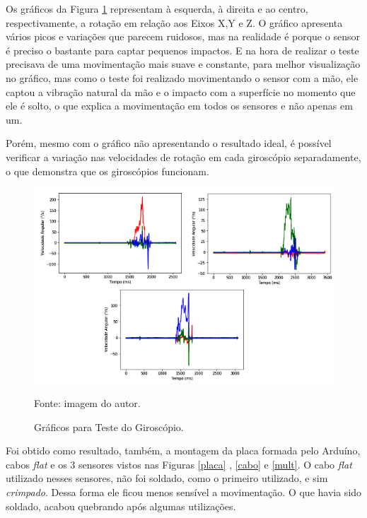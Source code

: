 	Os gráficos da Figura \ref{teste_giro} representam à esquerda, à direita e ao centro, respectivamente, a rotação em relação aos Eixos X,Y e Z. O gráfico apresenta vários picos e variações que parecem ruidosos, mas na realidade é porque o sensor é  preciso o bastante para captar pequenos impactos. E na hora de realizar o teste precisava de uma movimentação mais suave e constante, para melhor visualização no gráfico, mas como o teste foi realizado movimentando o sensor com a mão, ele captou a vibração natural da mão e o impacto com a superfície no momento que ele é solto, o que explica a movimentação em todos os sensores e não apenas em um.
	
	Porém, mesmo com o gráfico não apresentando o resultado ideal, é possível verificar a variação nas velocidades de rotação em cada giroscópio separadamente, o que demonstra que os giroscópios funcionam. 
	
	\begin{figure}[h]
		\centering
		\includegraphics[keepaspectratio=true,scale=0.7]{figuras/teste_giro.png}
		\caption{Gráficos para Teste do Giroscópio.}
		\footnotesize Fonte: imagem do autor. 
		\label{teste_giro}	
			    
	\end{figure}
	
			Foi obtido como resultado, também, a montagem da placa formada pelo Arduíno, cabos \textit{flat } e os 3 sensores vistos nas Figuras \ref{placa} , \ref{cabo} e \ref{mult}. O cabo \textit{flat} utilizado nesses sensores, não foi soldado, como  o primeiro utilizado, e sim \textit{crimpado}. Dessa forma ele ficou menos sensível a movimentação. O que havia sido soldado, acabou quebrando após algumas utilizações. 
		
